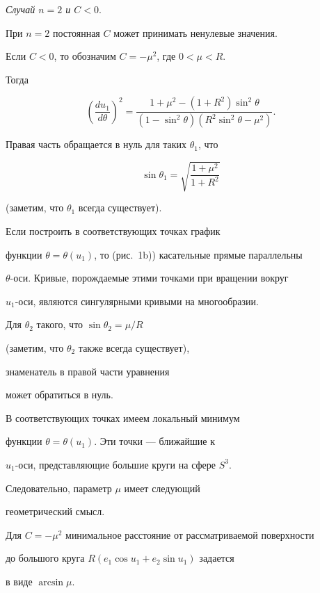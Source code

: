 \medskip








{\it Случай $n=2$ и $C<0$}.


При $n=2$ постоянная $C$ может принимать ненулевые значения.


Если $C < 0$, то обозначим $C = - \mu^2$, где $0 < \mu < R$.


Тогда


\begin{equation} \label{poch}


\left( \frac{d u_1}{d \theta} \right)^2 = 


\frac{1+\mu^2 - (1+R^2) \sin^2\theta}{(1-\sin^2\theta)(R^2\sin^2\theta-\mu^2)}.


\end{equation}


Правая часть обращается в нуль для таких $\theta_1$, что


$$


\sin\theta_1 = \sqrt{\frac{1+\mu^2}{1+R^2}} 


$$


(заметим, что $\theta_1$ всегда существует).


Если построить в соответствующих точках график


функции $\theta=\theta(u_1)$, то (рис.~1b)) касательные прямые параллельны


$\theta$-оси. Кривые, порождаемые этими точками при вращении вокруг


$u_1$-оси, являются сингулярными кривыми на многообразии.


Для $\theta_2$ такого, что $\sin\theta_2=\mu/R$


(заметим, что $\theta_2$ также всегда существует), 


знаменатель в правой части уравнения 


может обратиться в нуль.


В соответствующих точках имеем локальный минимум


функции $\theta=\theta(u_1)$. Эти точки --- ближайшие к


$u_1$-оси, представляющие большие круги на сфере $S^3$.


Следовательно, параметр $\mu$ имеет следующий


геометрический смысл.





\begin{cor}


Для $C=-\mu^2$ минимальное расстояние от рассматриваемой поверхности


до большого круга $R (e_1 \cos u_1 + e_2 \sin u_1)$ задается 


в виде $\arcsin\mu$. 


\end{cor}





